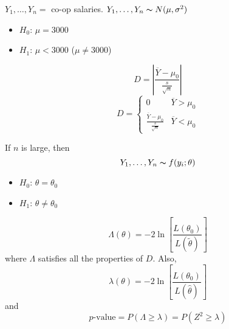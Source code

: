 \begin{exbox}
    \begin{example}
        $ Y_1,\ldots ,Y_n = $ co-op salaries. $ Y_1,\ldots ,Y_n \thicksim N(\mu,\sigma^2) $
        \begin{itemize}
            \item $ H_0 $: $ \mu=3000 $
            \item $ H_1 $: $ \mu<3000 $ ($ \mu\neq 3000 $)
        \end{itemize}
        \[ D=\left|\frac{\overline{Y}-\mu_0}{\frac{s}{\sqrt{n}}} \right| \]
        \[ D=
            \begin{cases}
                0                                             & \overline{Y}>\mu_0 \\
                \frac{\overline{Y}-\mu_0}{\frac{s}{\sqrt{n}}} & \overline{Y}<\mu_0
            \end{cases} \]
    \end{example}
\end{exbox}
If $ n $ is large, then
\[ Y_1,\ldots ,Y_n \thicksim f(y_i;\theta) \]
\begin{itemize}
    \item $ H_0 $: $ \theta=\theta_0 $
    \item $ H_1 $: $ \theta\neq \theta_0 $
\end{itemize}
\[ \Lambda(\theta)=-2\ln\left[ \frac{L(\theta_0)}{L(\tilde{\theta})} \right] \]
where $ \Lambda $ satisfies all the properties of $ D $. Also,
\[ \lambda(\theta)=-2\ln\left[ \frac{L(\theta_0)}{L(\hat{\theta})} \right] \]
and
\[ p\text{-value}=P(\Lambda\geqslant \lambda)=P(Z^2\geqslant \lambda) \]
